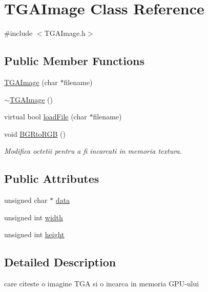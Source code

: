 \hypertarget{class_t_g_a_image}{\section{T\-G\-A\-Image Class Reference}
\label{class_t_g_a_image}
}


{\ttfamily \#include $<$T\-G\-A\-Image.\-h$>$}

\subsection*{Public Member Functions}
\begin{DoxyCompactItemize}
\item 
\hyperlink{class_t_g_a_image_a790b74801c879879bebe9e2ec2e04529}{T\-G\-A\-Image} (char $\ast$filename)
\item 
\hyperlink{class_t_g_a_image_a3b3d841039c8a6da816603f6f2933420}{$\sim$\-T\-G\-A\-Image} ()
\item 
virtual bool \hyperlink{class_t_g_a_image_ac68656afca46d4aedafaf55f8dff5ba6}{load\-File} (char $\ast$filename)
\item 
void \hyperlink{class_t_g_a_image_a39f001590a444a19145c388ac75139a0}{B\-G\-Rto\-R\-G\-B} ()
\begin{DoxyCompactList}\small\item\em Modifica octetii pentru a fi incarcati in memoria textura. \end{DoxyCompactList}\end{DoxyCompactItemize}
\subsection*{Public Attributes}
\begin{DoxyCompactItemize}
\item 
unsigned char $\ast$ \hyperlink{class_t_g_a_image_afd06806bae721d61ae49a600ef26e6d1}{data}
\item 
unsigned int \hyperlink{class_t_g_a_image_a8a7bef4441a3cd17e237bee43e654b5a}{width}
\item 
unsigned int \hyperlink{class_t_g_a_image_a1c4a71ac195496eeaf7ed6d3e9dfe0ac}{height}
\end{DoxyCompactItemize}


\subsection{Detailed Description}
care citeste o imagine T\-G\-A si o incarca in memoria G\-P\-U-\/ului 

